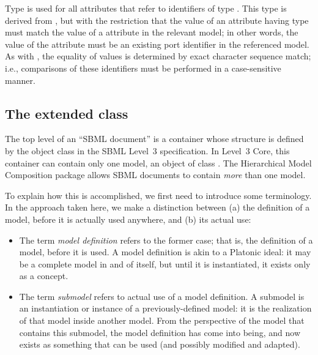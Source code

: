 Type  is used for all attributes that refer to
identifiers of type .  This type is derived from
, but with the restriction that the value of an
attribute having type  must match the value of a
 attribute in the relevant model;  in other words, the value of
the attribute must be an existing port identifier in
the referenced model.  As with , the equality of
 values is determined by exact character sequence
match; i.e., comparisons of these identifiers must be performed in a
case-sensitive manner.


\subsection{The extended  class}
\label{sbml-class}
\label{listofmodeldefinitions-class}
\label{listofexternalmodeldefinitions-class}

The top level of an ``SBML document'' is a container whose structure is
defined by the object class \SBML in the SBML Level~3 specification.  In
Level~3 Core, this container can contain only one model, an object of
class \Model.  The Hierarchical Model Composition package allows SBML
documents to contain \emph{more} than one model.

To explain how this is accomplished, we first need to introduce some
terminology.  In the approach taken here, we make a distinction between
(a) the definition of a model, before it is actually used anywhere, and
(b) its actual use:

\begin{itemize}

\item The term \emph{model definition} refers to the former case; that
  is, the definition of a model, before it is used.  A model definition
  is akin to a Platonic ideal: it may be a complete model in and of
  itself, but until it is instantiated, it exists only as a concept.

\item The term \emph{submodel} refers to actual use of a model
  definition.  A submodel is an instantiation or instance of a
  previously-defined model: it is the realization of that model inside
  another model.  From the perspective of the model that contains this
  submodel, the model definition has come into being, and now exists as
  something that can be used (and possibly modified and adapted).

\end{itemize}

